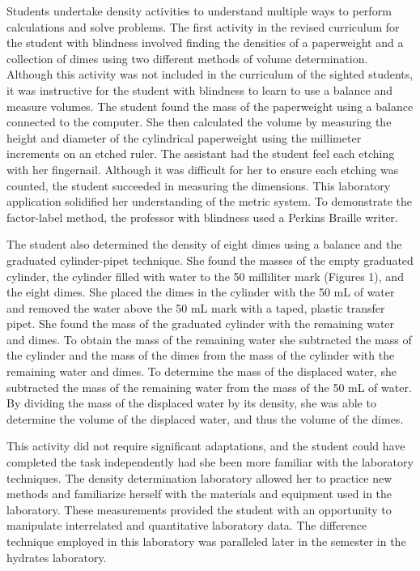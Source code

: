 \documentclass[11.5pt]{sig-alternate} %
\begin{document}
\begin{large}
Students undertake density activities to understand multiple ways to perform calculations and solve problems. The first activity in the revised curriculum for the student with blindness involved finding the densities of a paperweight and a collection of dimes using two different methods of volume determination. Although this activity was not included in the curriculum of the sighted students, it was instructive for the student with blindness to learn to use a balance and measure volumes. The student found the mass of the paperweight using a balance connected to the computer. She then calculated the volume by measuring the height and diameter of the cylindrical paperweight using the millimeter increments on an etched ruler. The assistant had the student feel each etching with her fingernail. Although it was difficult for her to ensure each etching was counted, the student succeeded in measuring the dimensions. This laboratory application solidified her understanding of the metric system. To demonstrate the factor-label method, the professor with blindness used a Perkins Braille writer. 

The student also determined the density of eight dimes using a balance and the graduated cylinder-pipet technique. She found the masses of the empty graduated cylinder, the cylinder filled with water to the 50 milliliter mark (Figures 1), and the eight dimes. She placed the dimes in the cylinder with the 50 mL of water and removed the water above the 50 mL mark with a taped, plastic transfer pipet. She found the mass of the graduated cylinder with the remaining water and dimes. To obtain the mass of the remaining water she subtracted the mass of the cylinder and the mass of the dimes from the mass of the cylinder with the remaining water and dimes. To determine the mass of the displaced water, she subtracted the mass of the remaining water from the mass of the 50 mL of water. By dividing the mass of the displaced water by its density, she was able to determine the volume of the displaced water, and thus the volume of the dimes. 

This activity did not require significant adaptations, and the student could have completed the task independently had she been more familiar with the laboratory techniques. The density determination laboratory allowed her to practice new methods and familiarize herself with the materials and equipment used in the laboratory. These measurements provided the student with an opportunity to manipulate interrelated and quantitative laboratory data. The difference technique employed in this laboratory was paralleled later in the semester in the hydrates laboratory. 


\end{large}
\end{document}
